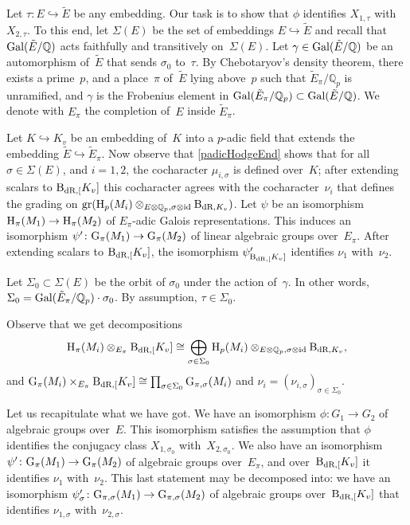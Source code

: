 \documentclass[10pt,twoside,leqno]{article}
\numberwithin{equation}{subsection}
\newcommand{\id}{\textnormal{id}}
\newcommand{\into}{\hookrightarrow}
\newcommand{\QQ}{\mathbb{Q}}
\newcommand{\QQp}{\QQ_{p}}
\newcommand{\Gal}{\textnormal{Gal}}
\newcommand{\BdR}[1]{\textnormal{B}_{\dR,#1}}
\newcommand{\gr}{\textnormal{gr}}
\newcommand{\dR}{\textnormal{dR}}
\newcommand{\HH}{\textnormal{H}}
\newcommand{\Hp}{\HH_{p}}
\newcommand{\GG}{\textnormal{G}}
\begin{document}
Let \(\tau \colon E \into \tilde{E}\) be any embedding.
Our task is to show that \(\phi\) identifies
\(X_{1,\tau}\) with~\(X_{2,\tau}\).
To this end, let \(\Sigma(E)\) be the set of embeddings \(E \into \tilde{E}\)
and recall that \(\Gal(\tilde{E}/\QQ)\)
acts faithfully and transitively on~\(\Sigma(E)\).
Let \(\gamma \in \Gal(\tilde{E}/\QQ)\) be an automorphism of~\(\tilde{E}\)
that sends \(\sigma_{0}\) to~\(\tau\).
By Chebotaryov's density theorem,
there exists a prime~\(p\),
and a place~\(\pi\) of~\(\tilde{E}\) lying above~\(p\)
such that
\(\tilde{E}_{\pi}/\QQp\) is unramified, and
\(\gamma\) is the Frobenius element in
\(\Gal(\tilde{E}_{\pi}/\QQp) \subset \Gal(\tilde{E}/\QQ)\).
We denote with \(E_{\pi}\) the completion of~\(E\) inside \(\tilde{E}_{\pi}\).

Let \(K \into K_{v}\) be an embedding of~\(K\) into a \(p\)-adic field
that extends the embedding \(\tilde{E} \into \tilde{E}_{\pi}\).
Now observe that \cref{padicHodgeEnd} shows that
for all \(\sigma \in \Sigma(E)\), and \(i = 1,2\),
the cocharacter \(\mu_{i,\sigma}\) is defined over~\(K\);
after extending scalars to \(\BdR[K_{v}]\)
this cocharacter agrees with the cocharacter~\(\nu_{i}\)
that defines the grading on
\(\gr(\Hp(M_{i}) \otimes_{E \otimes \QQp, \sigma \otimes \id} \BdR{K_{v}})\).
Let \(\psi\) be an isomorphism \(\HH_{\pi}(M_{1}) \to \HH_{\pi}(M_{2})\)
of \(E_{\pi}\)-adic Galois representations.
This induces an isomorphism
\(\psi' \colon \GG_{\pi}(M_{1}) \to \GG_{\pi}(M_{2})\)
of linear algebraic groups over~\(E_{\pi}\).
After extending scalars to \(\BdR[K_{v}]\),
the isomorphism \(\psi'_{\BdR[K_{v}]}\) identifies \(\nu_{1}\) with~\(\nu_{2}\).

Let \(\Sigma_{0} \subset \Sigma(E)\) be the orbit of \(\sigma_{0}\)
under the action of~\(\gamma\).
In other words, \(\Sigma_{0} = \Gal(\tilde{E}_{\pi}/\QQp) \cdot \sigma_{0}\).
By assumption, \(\tau \in \Sigma_{0}\).

Observe that we get decompositions
\[
 \HH_{\pi}(M_{i}) \otimes_{E_{\pi}} \BdR[K_{v}] \cong
 \bigoplus_{\sigma \in \Sigma_{0}}
 \Hp(M_{i}) \otimes_{E \otimes \QQp, \sigma \otimes \id} \BdR{K_{v}},
\]
and \(\GG_{\pi}(M_{i}) \times_{E_{\pi}} \BdR[K_{v}] \cong
 \prod_{\sigma \in \Sigma_{0}} \GG_{\pi,\sigma}(M_{i})\)
and \(\nu_{i} = (\nu_{i,\sigma})_{\sigma \in \Sigma_{0}}\).


Let us recapitulate what we have got.
We have an isomorphism \(\phi \colon G_{1} \to G_{2}\)
of algebraic groups over~\(E\).
This isomorphism satisfies the assumption that \(\phi\) identifies
the conjugacy class \(X_{1,\sigma_{0}}\) with~\(X_{2,\sigma_{0}}\).
We also have an isomorphism
\(\psi' \colon \GG_{\pi}(M_{1}) \to \GG_{\pi}(M_{2})\)
of algebraic groups over~\(E_{\pi}\),
and over~\(\BdR[K_{v}]\) it identifies \(\nu_{1}\) with~\(\nu_{2}\).
This last statement may be decomposed into:
we have an isomorphism
\(\psi'_{\sigma} \colon \GG_{\pi,\sigma}(M_{1}) \to \GG_{\pi,\sigma}(M_{2})\)
of algebraic groups over~\(\BdR[K_{v}]\)
that identifies \(\nu_{1,\sigma}\) with~\(\nu_{2,\sigma}\).
\end{document}
